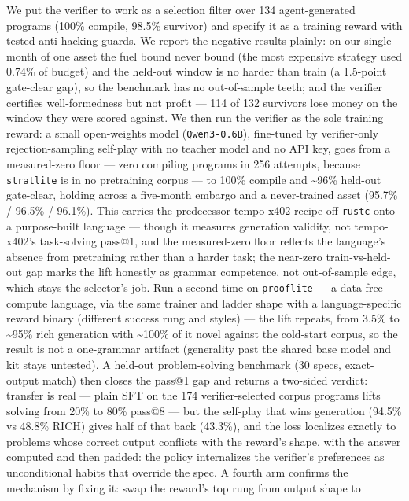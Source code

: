 \documentclass[11pt]{article}
\newcommand{\code}[1]{\texttt{#1}}
\begin{document}
We put the verifier to work as a selection filter over 134 agent-generated
programs (100\% compile, 98.5\% survivor) and specify it as a training reward
with tested anti-hacking guards. We report the negative results plainly: on our
single month of one asset the fuel bound never bound (the most expensive
strategy used 0.74\% of budget) and the held-out window is no harder than train
(a 1.5-point gate-clear gap), so the benchmark has no out-of-sample teeth; and
the verifier certifies well-formedness but not profit --- 114 of 132 survivors
lose money on the window they were scored against. We then run the verifier as
the sole training reward: a small open-weights model (\code{Qwen3-0.6B}), fine-tuned
by verifier-only rejection-sampling self-play with no teacher model and no API
key, goes from a measured-zero floor --- zero compiling programs in 256 attempts,
because \code{stratlite} is in no pretraining corpus --- to 100\% compile and \textasciitilde{}96\%
held-out gate-clear, holding across a five-month embargo and a never-trained
asset (95.7\% / 96.5\% / 96.1\%). This carries the predecessor tempo-x402 recipe
off \code{rustc} onto a purpose-built language --- though it measures generation
validity, not tempo-x402's task-solving pass@1, and the measured-zero floor
reflects the language's absence from pretraining rather than a harder task; the
near-zero train-vs-held-out gap marks the lift honestly as grammar competence,
not out-of-sample edge, which stays the selector's job. Run a second time on
\code{prooflite} --- a data-free compute language, via the same trainer and ladder
shape with a language-specific reward binary (different success rung and styles)
--- the lift repeats, from 3.5\% to \textasciitilde{}95\% rich generation with \textasciitilde{}100\% of it novel
against the cold-start corpus, so the result is not a one-grammar artifact
(generality past the shared base model and kit stays untested). A held-out
problem-solving benchmark (30 specs, exact-output match) then closes the
pass@1 gap and returns a two-sided verdict: transfer is real --- plain SFT on
the 174 verifier-selected corpus programs lifts solving from 20\% to 80\%
pass@8 --- but the self-play that wins generation (94.5\% vs 48.8\% RICH) gives
half of that back (43.3\%), and the loss localizes exactly to problems whose
correct output conflicts with the reward's shape, with the answer computed
and then padded: the policy internalizes the verifier's preferences as
unconditional habits that override the spec. A fourth arm confirms the
mechanism by fixing it: swap the reward's top rung from output shape to
\end{document}
